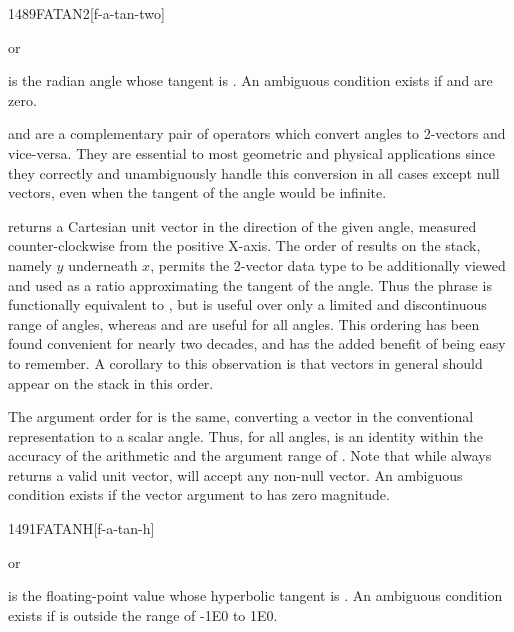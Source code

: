 \begin{worddef}{1489}{FATAN2}[f-a-tan-two]
\item {} or

	 is the radian angle whose tangent is .
	An ambiguous condition exists if  and  are
	zero.

	\begin{rationale} %
		 and  are a complementary pair of
		operators which convert angles to 2-vectors and vice-versa.
		They are essential to most geometric and physical applications
		since they correctly and unambiguously handle this conversion
		in all cases except null vectors, even when the tangent of the
		angle would be infinite.

		 returns a Cartesian unit vector in the direction
		of the given angle, measured counter-clockwise from the positive
		X-axis. The order of results on the stack, namely $y$ underneath
		$x$, permits the 2-vector data type to be additionally viewed
		and used as a ratio approximating the tangent of the angle. Thus
		the phrase   is functionally equivalent
		to , but is useful over only a limited and
		discontinuous range of angles, whereas  and
		 are useful for all angles. This ordering has been
		found convenient for nearly two decades, and has the added
		benefit of being easy to remember. A corollary to this
		observation is that vectors in general should appear on the
		stack in this order.

		The argument order for  is the same, converting a
		vector in the conventional representation to a scalar angle.
		Thus, for all angles,   is an identity
		within the accuracy of the arithmetic and the argument range of
		. Note that while  always returns a
		valid unit vector,  will accept any non-null vector.
		An ambiguous condition exists if the vector argument to
		 has zero magnitude.
	\end{rationale}
\end{worddef}


\begin{worddef}{1491}{FATANH}[f-a-tan-h]
\item {} or

	 is the floating-point value whose hyperbolic tangent is
	. An ambiguous condition exists if  is outside
	the range of -1E0 to 1E0.
\end{worddef}



